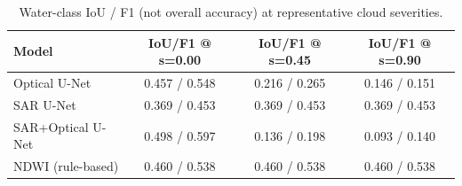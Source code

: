 \begin{table}[t]
\centering
\caption{Water-class IoU / F1 (not overall accuracy) at representative cloud severities.}
\label{tab:iou_f1_by_severity}
\begin{tabular}{lccc}
\toprule
Model & IoU/F1 @ s=0.00 & IoU/F1 @ s=0.45 & IoU/F1 @ s=0.90 \\
\midrule
Optical U-Net & 0.457 / 0.548 & 0.216 / 0.265 & 0.146 / 0.151 \\
SAR U-Net & 0.369 / 0.453 & 0.369 / 0.453 & 0.369 / 0.453 \\
SAR+Optical U-Net & 0.498 / 0.597 & 0.136 / 0.198 & 0.093 / 0.140 \\
NDWI (rule-based) & 0.460 / 0.538 & 0.460 / 0.538 & 0.460 / 0.538 \\
\bottomrule
\end{tabular}
\end{table}